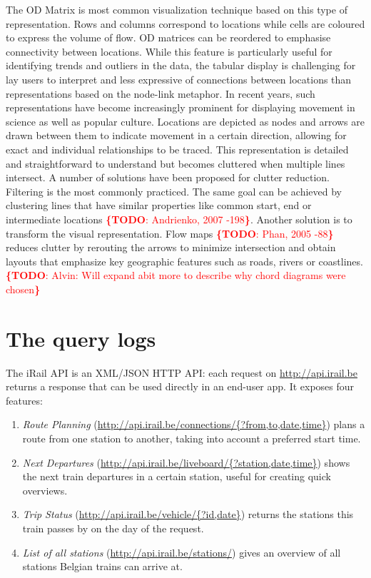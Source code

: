 \documentclass{sig-alternate}
\newcommand{\todo}[1]{\noindent\textcolor{red}{{\bf \{TODO}: #1{\bf \}}}}
\begin{document}
The OD Matrix is most common visualization technique based on this type of representation. 
Rows and columns correspond to locations while cells are coloured to express the volume of flow.
OD matrices can be reordered to emphasise connectivity between locations.
While this feature is particularly useful for identifying trends and outliers in the data, the tabular display is challenging for lay users to interpret and less expressive of connections between locations than representations based on the node-link metaphor.
In recent years, such representations have become increasingly prominent for displaying movement in science as well as popular culture.
Locations are depicted as nodes and arrows are drawn between them to indicate movement in a certain direction, allowing for exact and individual relationships to be traced. 
This representation is detailed and straightforward to understand but becomes cluttered when multiple lines intersect. 
A number of solutions have been proposed for clutter reduction. 
Filtering is the most commonly practiced. 
The same goal can be achieved by clustering lines that have similar properties like common start, end or intermediate locations \todo{Andrienko, 2007 -198}. 
Another solution is to transform the visual representation. 
Flow maps \todo{Phan, 2005 -88} reduces clutter by rerouting the arrows to minimize intersection and obtain layouts that emphasize key geographic features such as roads, rivers or coastlines. 
\todo{Alvin: Will expand abit more to describe why chord diagrams were chosen} 

\section{The query logs}
\label{sec:logs}

The iRail API is an XML/JSON HTTP API: each request on \url{http://api.irail.be} returns a response that can be used directly in an end-user app.
It exposes four features: 
\begin{enumerate}
\item \emph{Route Planning} (\url{http://api.irail.be/connections/{?from,to,date,time}}) plans a route from one station to another, taking into account a preferred start time.
\item \emph{Next Departures} (\url{http://api.irail.be/liveboard/{?station,date,time}}) shows the next train departures in a certain station, useful for creating quick overviews.
\item \emph{Trip Status} (\url{http://api.irail.be/vehicle/{?id,date}}) returns the stations this train passes by on the day of the request.
\item \emph{List of all stations} (\url{http://api.irail.be/stations/}) gives an overview of all stations Belgian trains can arrive at.
\end{enumerate}
\end{document}
